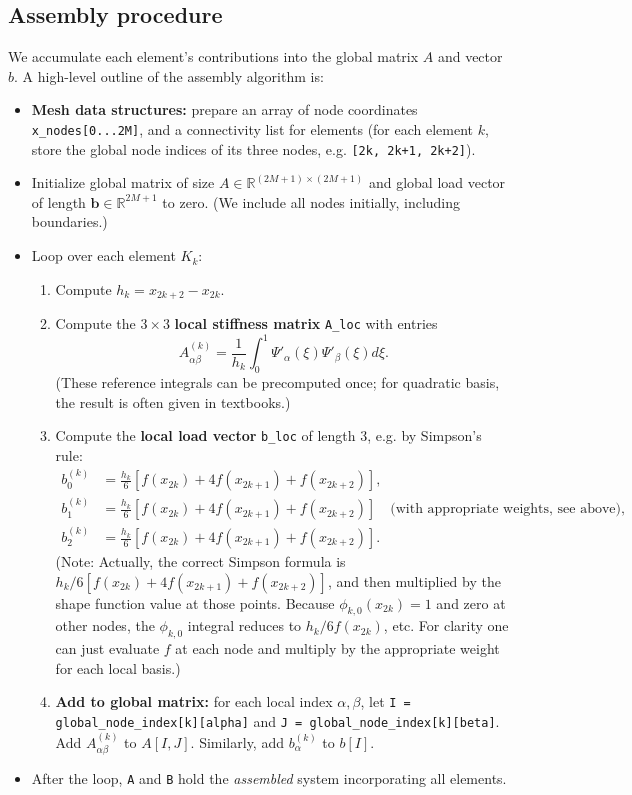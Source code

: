 \documentclass[a4paper,10pt]{article}
\begin{document}
\subsection*{Assembly procedure}
We accumulate each element's contributions into the global matrix \(A\) and vector \(b\). A high-level outline of the assembly algorithm is:
\begin{itemize}
	\item \textbf{Mesh data structures:} 
	prepare an array of node coordinates \texttt{x_nodes[0...2M]}, and a connectivity list for elements (for each element \(k\), store the global node indices of its three nodes, e.g. \texttt{[2k, 2k+1, 2k+2]}).
	\item Initialize global matrix of size \(A \in \mathbb{R}^{(2M+1)\times(2M+1)}\) and global load vector of length \(\mathbf{b} \in \mathbb{R}^{2M+1}\) to zero. 
	(We include all nodes initially, including boundaries.)
	\item Loop over each element \(K_k\):
	      \begin{enumerate}
		      \item Compute \(h_k = x_{2k+2} - x_{2k}\).
		      \item  Compute the \(3 \times 3\) \textbf{local stiffness matrix} \texttt{A_loc} with entries
		            \[A^{(k)}_{\alpha\beta} = \frac{1}{h_k}\int_0^1 \Psi'_{\alpha}(\xi)\Psi'_{\beta}(\xi)d\xi.\]
		            (These reference integrals can be precomputed once; for quadratic basis, the result is often given in textbooks.)
		      \item Compute the \textbf{local load vector} \texttt{b_loc} of length 3, e.g. by Simpson's rule:
			  		\begin{align*}			  			
		            b^{(k)}_0 &= \frac{h_k}{6}[f(x_{2k}) + 4f(x_{2k+1}) + f(x_{2k+2})],\\
		            b^{(k)}_1 &= \frac{h_k}{6}[f(x_{2k}) + 4f(x_{2k+1}) + f(x_{2k+2})] \quad\text{(with appropriate weights, see above)},\\
		            b^{(k)}_2 &= \frac{h_k}{6}[f(x_{2k}) + 4f(x_{2k+1}) + f(x_{2k+2})].
					\end{align*}
		            (Note: Actually, the correct Simpson formula is \(h_k/6 [f(x_{2k}) + 4f(x_{2k+1}) + f(x_{2k+2})]\), and then multiplied by the shape function value at those points.
		            Because \(\phi_{k,0}(x_{2k})=1\) and zero at other nodes, the \(\phi_{k,0}\) integral reduces to \(h_k/6 f(x_{2k})\), etc.
		            For clarity one can just evaluate \(f\) at each node and multiply by the appropriate weight for each local basis.)
		      \item \textbf{Add to global matrix:} for each local index \(\alpha,\beta\), let \texttt{I = global_node_index[k][alpha]} and \texttt{J = global_node_index[k][beta]}.
		            Add \(A^{(k)}_{\alpha\beta}\) to \(A[I,J]\).
		            Similarly, add \(b^{(k)}_{\alpha}\) to \(b[I]\).
	      \end{enumerate}
	\item  After the loop, \texttt{A} and \texttt{B} hold the \emph{assembled} system incorporating all elements.
\end{itemize}
\end{document}
